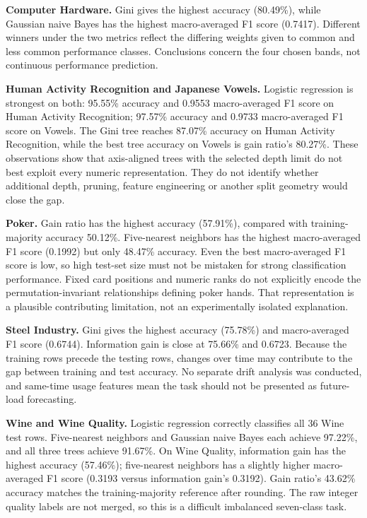 \documentclass[11pt,letterpaper]{article}
\begin{document}
\textbf{Computer Hardware.}
Gini gives the highest accuracy (80.49\%), while Gaussian naive Bayes has the highest macro-averaged F1 score
(0.7417). Different winners under the two metrics reflect the differing weights
given to common and less common performance classes. Conclusions concern the four
chosen bands, not continuous performance prediction.

\textbf{Human Activity Recognition and Japanese Vowels.}
Logistic regression is strongest on both: 95.55\% accuracy and 0.9553 macro-averaged F1 score on Human Activity Recognition; 97.57\%
accuracy and 0.9733 macro-averaged F1 score on Vowels. The Gini tree reaches 87.07\% accuracy
on Human Activity Recognition, while the best tree accuracy on Vowels is gain ratio's 80.27\%. These observations
show that axis-aligned trees with the selected depth limit do not best exploit
every numeric representation. They do not identify whether additional depth,
pruning, feature engineering or another split geometry would close the gap.

\textbf{Poker.}
Gain ratio has the highest accuracy (57.91\%), compared with training-majority accuracy
50.12\%. Five-nearest neighbors has the highest macro-averaged F1 score (0.1992) but only 48.47\% accuracy. Even the
best macro-averaged F1 score is low, so high test-set size must not be mistaken for strong
classification performance. Fixed card positions and numeric ranks do not
explicitly encode the permutation-invariant relationships defining poker hands.
That representation is a plausible contributing limitation, not an experimentally
isolated explanation.

\textbf{Steel Industry.}
Gini gives the highest accuracy (75.78\%) and macro-averaged F1 score (0.6744). Information gain is close at
75.66\% and 0.6723. Because the training rows precede the testing rows, changes over time may
contribute to the gap between training and test accuracy. No
separate drift analysis was conducted, and same-time usage features mean the
task should not be presented as future-load forecasting.

\textbf{Wine and Wine Quality.}
Logistic regression correctly classifies all 36 Wine test rows. Five-nearest neighbors and Gaussian naive Bayes each achieve 97.22\%,
and all three trees achieve 91.67\%.  On Wine Quality, information gain has the highest accuracy (57.46\%);
five-nearest neighbors has a slightly higher macro-averaged F1 score (0.3193 versus information gain's 0.3192). Gain ratio's 43.62\%
accuracy matches the training-majority reference after rounding. The raw integer
quality labels are not merged, so this is a difficult imbalanced seven-class task.
\end{document}

